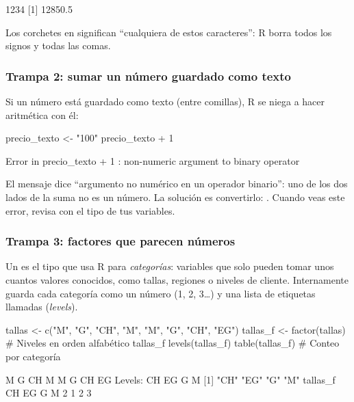 \begin{rsalida}
[1] 1234
[1] 12850.5
\end{rsalida}

Los corchetes en  significan ``cualquiera de estos
caracteres'': R borra todos los signos \codigo{\$} y todas las comas.

\subsubsection{Trampa 2: sumar un número guardado como texto}

Si un número está guardado como texto (entre comillas), R se niega a hacer
aritmética con él:

\begin{rnoejecutar}
precio_texto <- "100"
precio_texto + 1
\end{rnoejecutar}
\begin{rsalida}
Error in precio_texto + 1 : non-numeric argument to binary operator
\end{rsalida}

El mensaje dice ``argumento no numérico en un operador binario'': uno de
los dos lados de la suma no es un número. La solución es convertirlo:
. Cuando veas este error, revisa con
 el tipo de tus variables.

\subsubsection{Trampa 3: factores que parecen números}

Un  es el tipo que usa R para \emph{categorías}: variables
que solo pueden tomar unos cuantos valores conocidos, como tallas, regiones
o niveles de cliente. Internamente guarda cada categoría como un número
(1, 2, 3\ldots) y una lista de etiquetas llamadas 
(\emph{levels}).

\begin{rcode}
tallas <- c("M", "G", "CH", "M", "M", "G", "CH", "EG")
tallas_f <- factor(tallas)            # Niveles en orden alfabético
tallas_f
levels(tallas_f)
table(tallas_f)                       # Conteo por categoría
\end{rcode}
\begin{rsalida}
[1] M  G  CH M  M  G  CH EG
Levels: CH EG G M
[1] "CH" "EG" "G"  "M" 
tallas_f
CH EG  G  M 
 2  1  2  3 
\end{rsalida}

